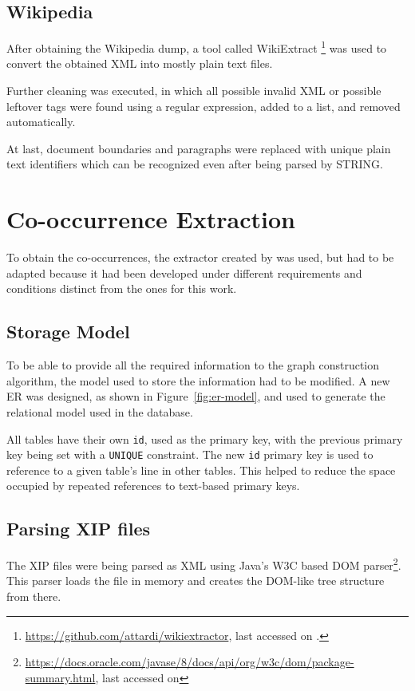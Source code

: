 \subsection{Wikipedia}

After obtaining the Wikipedia dump, a tool called WikiExtract
\footnote{\url{https://github.com/attardi/wikiextractor}, last accessed on
.} was used to convert the obtained \ac{XML} into mostly
plain text files.

Further cleaning was executed, in which all possible invalid \ac{XML} or
possible leftover tags were found using a regular expression, added to a list,
and removed automatically.

At last, document boundaries and paragraphs were replaced with unique
plain text identifiers which can be recognized even after being parsed by
\ac{STRING}.

\section{Co-occurrence Extraction}

To obtain the co-occurrences, the extractor created by \citet{correia2015syntax}
was used, but had to be adapted because it had been developed under different
requirements and conditions distinct from the ones for this work.

\subsection{Storage Model}

To be able to provide all the required information to the graph construction
algorithm, the model used to store the information had to be modified. A new 
\ac{ER} was designed, as shown in Figure~\ref{fig:er-model}, and used to
generate the relational model used in the database.

All tables have their own \texttt{id}, used as the primary key, with the 
previous primary key being set with a \texttt{UNIQUE} constraint. The new 
\texttt{id} primary key is used to reference to a given table's line in other 
tables. This helped to reduce the space occupied by repeated references to 
text-based primary keys.

\subsection{Parsing \ac{XIP} files}

The \ac{XIP} files were being parsed as XML using Java's W3C based \ac{DOM}
parser\footnote{\url{https://docs.oracle.com/javase/8/docs/api/org/w3c/dom/package-summary.html},
last accessed on }. This parser loads the file in memory and
creates the \ac{DOM}-like tree structure from there.

